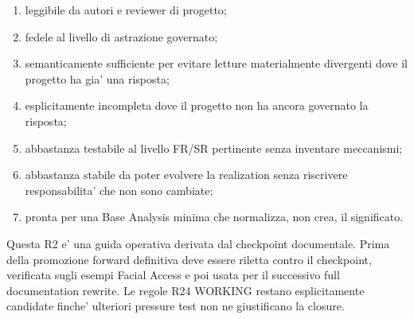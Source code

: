 \documentclass[11pt,a4paper]{article}
\begin{document}
\begin{enumerate}
\item leggibile da autori e reviewer di progetto;
\item fedele al livello di astrazione governato;
\item semanticamente sufficiente per evitare letture materialmente divergenti dove il progetto ha gia' una risposta;
\item esplicitamente incompleta dove il progetto non ha ancora governato la risposta;
\item abbastanza testabile al livello FR/SR pertinente senza inventare meccanismi;
\item abbastanza stabile da poter evolvere la realization senza riscrivere responsabilita' che non sono cambiate;
\item pronta per una Base Analysis minima che normalizza, non crea, il significato.
\end{enumerate}

\begin{statusworking}
Questa R2 e' una guida operativa derivata dal checkpoint documentale. Prima della promozione forward definitiva deve essere riletta contro il checkpoint, verificata sugli esempi Facial Access e poi usata per il successivo full documentation rewrite. Le regole R24 WORKING restano esplicitamente candidate finche' ulteriori pressure test non ne giustificano la closure.
\end{statusworking}
\end{document}
